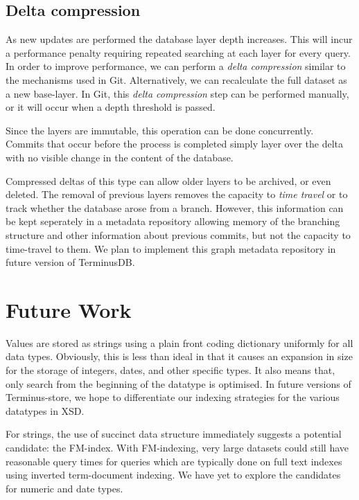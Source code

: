 \documentclass[10pt, a4paper, twocolumn]{article} %
\begin{document}

\subsection{Delta compression}

As new updates are performed the database layer depth increases. This
will incur a performance penalty requiring repeated searching at each
layer for every query. In order to improve performance, we can perform
a {\em delta compression} similar to the mechanisms used in
Git. Alternatively, we can recalculate the full dataset as a new
base-layer. In Git, this {\em delta compression} step can be performed
manually, or it will occur when a depth threshold is passed.

Since the layers are immutable, this operation can be done
concurrently. Commits that occur before the process is completed simply
layer over the delta with no visible change in the content of
the database.

Compressed deltas of this type can allow older layers to be archived,
or even deleted. The removal of previous layers removes the capacity
to {\em time travel} or to track whether the database arose from a
branch. However, this information can be kept seperately in a metadata
repository allowing memory of the branching structure and other
information about previous commits, but not the capacity to
time-travel to them. We plan to implement this graph metadata
repository in future version of TerminusDB.

\section{Future Work}

Values are stored as strings using a plain front coding dictionary
uniformly for all data types. Obviously, this is less than ideal in
that it causes an expansion in size for the storage of integers,
dates, and other specific types. It also means that, only search from
the beginning of the datatype is optimised. In future versions of
Terminus-store, we hope to differentiate our indexing strategies for
the various datatypes in XSD.

For strings, the use of succinct data structure immediately suggests a
potential candidate: the
FM-index\autocite{Ferragina:2005:ICT:1082036.1082039}. With FM-indexing,
very large datasets could still have reasonable query times for
queries which are typically done on full text indexes using inverted
term-document indexing. We have yet to explore the candidates for
numeric and date types.
\end{document}

